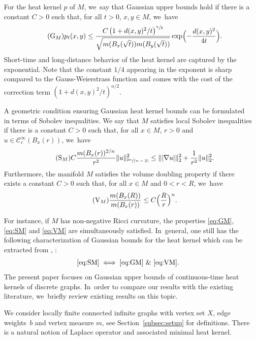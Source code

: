 \documentclass[10pt]{amsart}
\newcommand{\spfrac}[2]{\sfrac{#1}{(#2)}}
\newcommand{\rG}{\mathrm{G}}
\newcommand{\rS}{\mathrm{S}}
\newcommand{\rV}{\mathrm{V}}
\theoremstyle{plain}
\theoremstyle{definition}
\newcommand{\cC}{\mathcal{C}}
\begin{document}
For the heat kernel $p$ of $M$, we~say that Gaussian upper bounds hold if there is a constant $C>0$ such that, for all $t>0$, $x,y\in M$, we~have
\begin{equation}\tag{$\rG_M$}\label{eq:GM}
p_t(x,y)\leq \frac{C\left(1+{d(x,y)^2}/{t}\right)^{\sfrac{n}{2}}}{\sqrt{m(B_x(\sqrt t))m(B_y(\sqrt t))}}\exp\Bigl(-\frac{d(x,y)^2}{4t}\Bigr).
\end{equation}
Short-time and long-distance behavior of the heat kernel are captured by the exponential.
Note that the constant $1/4$ appearing in the exponent is sharp compared to the Gauss-Weierstrass function and comes with the cost of the correction term $\left(1+{d(x,y)^2}/{t}\right)^{n/2}$.

A geometric condition ensuring Gaussian heat kernel bounds can be formulated in terms of Sobolev inequalities.
We say that $M$ satisfies local Sobolev inequalities if there is a constant $C>0$ such that, for all $x\in M$, $r>0$ and $u\in\cC_c^\infty(B_x(r))$, we~have
\begin{equation}\tag{$\rS_M$}\label{eq:SM}
C\frac{m(B_x(r))^{2/n}}{r^2}\|u\|_{\spfrac{2n}{n-2}}^2\leq \||\nabla u|\|_2^2+\frac{1}{r^2}\|u\|_2^2.
\end{equation}
Furthermore, the manifold $M$ satisfies the volume doubling property if there exists a constant $C>0$ such that, for all $x\in M$ and $0<r<R$, we~have
\begin{equation}\tag{$\rV_M$}\label{eq:VM}
\frac{m(B_x(R))}{m(B_x(r))}\leq C\Bigl(\frac{R}{r}\Bigr)^n.
\end{equation}

For instance, if $M$ has non-negative Ricci curvature, the properties \eqref{eq:GM}, \eqref{eq:SM} and \eqref{eq:VM} are simultaneously satisfied. In~general, one still has
the following characterization of Gaussian bounds for the heat kernel which can be extracted from {\cite{Grigoryan-94,BakryCLS-95}}, \cf \cite{SaloffC-01}:
\[
\eqref{eq:SM} \iff \eqref{eq:GM}\ \& \ \eqref{eq:VM}.
\]
The present paper focuses on Gaussian upper bounds of continuous-time heat kernels of discrete graphs. In~order to compare our results with the existing literature, we~briefly review existing results on this topic.

We consider locally finite connected infinite graphs with vertex set $X$, edge weights~$b$ and vertex measure $m$, see Section~\ref{subsec:setup} for definitions. There is a natural notion of Laplace operator and associated minimal heat kernel.
\end{document}
